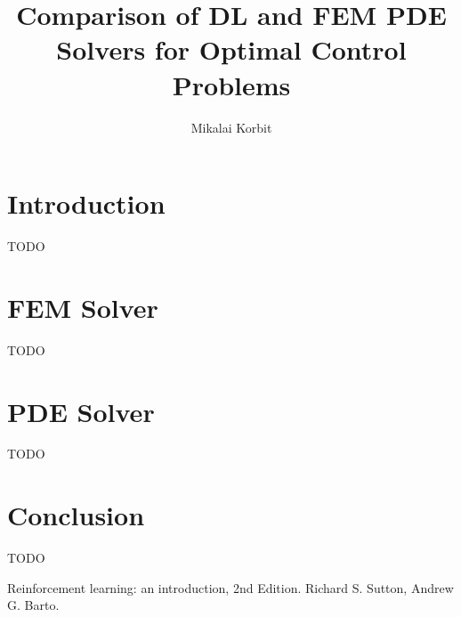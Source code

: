 \documentclass[a4 paper]{article}
\title{Comparison of DL and FEM PDE Solvers for Optimal Control Problems }
\author{Mikalai Korbit}
\begin{document}
\maketitle


\section{Introduction}

TODO



\section{FEM Solver}\label{sec:env}

TODO


\section{PDE Solver}

TODO


\section{Conclusion}

TODO



\begin{thebibliography}{9}


\label{rl} 
Reinforcement learning: an introduction, 2nd Edition. 
Richard S. Sutton, Andrew G. Barto. 


\end{thebibliography}
\end{document}
